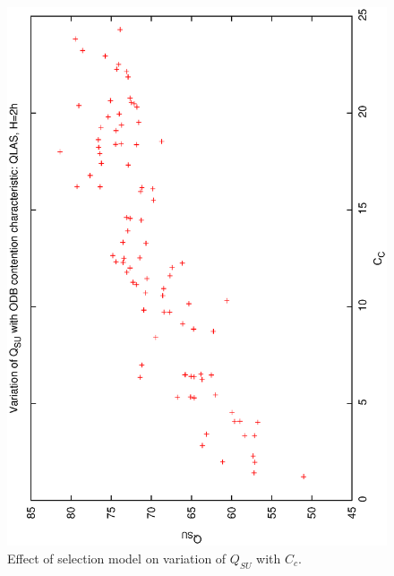 \begin{figure}[h]
 \label{fig:qsucc_ql2}
\begin{center}
 \includegraphics[scale=0.5, angle=-90]{figures/qsucc_ql2.eps}
 \caption[Effect of selection model on variation of $Q_{SU}$ with $C_c$.] 
   {Effect of selection model on variation of $Q_{SU}$ with $C_c$.}
\end{center}
\end{figure}

